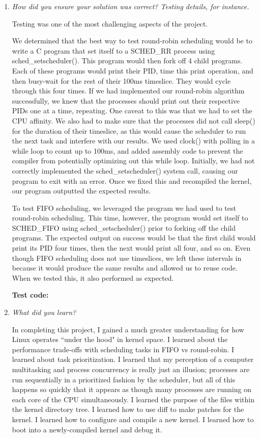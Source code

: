 \documentclass[letterpaper,10pt,titlepage]{article}
\newcommand{\tab}{\hspace*{2em}} %
\begin{document}
\begin{enumerate}
\item \emph{How did you ensure your solution was correct? Testing details, for instance.}

\tab Testing was one of the most challenging aspects of the project. 

\tab We determined that the best way to test round-robin scheduling would be to write a C program that set itself to a SCHED\_RR process using sched\_setscheduler(). This program would then fork off 4 child programs. Each of these programs would print their PID, time this print operation, and then busy-wait for the rest of their 100ms timeslice. They would cycle through this four times. If we had implemented our round-robin algorithm successfully, we knew that the processes should print out their respective PIDs one at a time, repeating. One caveat to this was that we had to set the CPU affinity. We also had to make sure that the processes did not call sleep() for the duration of their timeslice, as this would cause the scheduler to run the next task and interfere with our results. We used clock() with polling in a while loop to count up to 100ms, and added assembly code to prevent the compiler from potentially optimizing out this while loop. Initially, we had not correctly implemented the sched\_setscheduler() system call, causing our program to exit with an error. Once we fixed this and recompiled the kernel, our program outputted the expected results.

\tab To test FIFO scheduling, we leveraged the program we had used to test round-robin scheduling. This time, however, the program would set itself to SCHED\_FIFO using sched\_setscheduler() prior to forking off the child programs. The expected output on success would be that the first child would print its PID four times, then the next would print all four, and so on. Even though FIFO scheduling does not use timeslices, we left these intervals in because it would produce the same results and allowed us to reuse code. When we tested this, it also performed as expected.

\tab \textbf{Test code:} 



\item \emph{What did you learn?}

\tab In completing this project, I gained a much greater understanding for how Linux operates ``under the hood" in kernel space. I learned about the performance trade-offs with scheduling tasks in FIFO vs round-robin. I learned about task prioritization. I learned that my perception of a computer multitasking and process concurrency is really just an illusion; processes are run sequentially in a prioritized fashion by the scheduler, but all of this happens so quickly that it appears as though many processes are running on each core of the CPU simultaneously. I learned the purpose of the files within the kernel directory tree. I learned how to use diff to make patches for the kernel. I learned how to configure and compile a new kernel. I learned how to boot into a newly-compiled kernel and debug it.

\end{enumerate}

%
\end{document}
